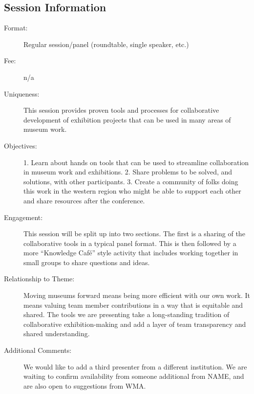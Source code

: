 \documentclass{report}
\begin{document}
              \subsection*{Session Information}
                \begin{description}
                  \item [Format:] Regular session/panel (roundtable, single speaker, etc.)
							    
								  \item [Fee:]n/a
							     
							    \item [Uniqueness:]This session provides proven tools and processes for collaborative development of exhibition projects that can be used in many areas of museum work.
							    \item [Objectives:]1. Learn about hands on tools that can be used to streamline collaboration in museum work and exhibitions.
2. Share problems to be solved, and solutions, with other participants.
3. Create a community of folks doing this work in the western region who might be able to support each other and share resources after the conference.
							    \item [Engagement:]This session will be split up into two sections. The first is a sharing of the collaborative tools in a typical panel format. This is then followed by a more “Knowledge Café” style activity that includes working together in small groups to share questions and ideas.
							    \item [Relationship to Theme:]Moving museums forward means being more efficient with our own work. It means valuing team member contributions in a way that is equitable and shared. The tools we are presenting take a long-standing tradition of collaborative exhibition-making and add a layer of team transparency and shared understanding.
							    
                    \item [Additional Comments: ]We would like to add a third presenter from a different institution. We are waiting to confirm availability from someone additional from NAME, and are also open to suggestions from WMA.

                \end{description}
\end{document}

